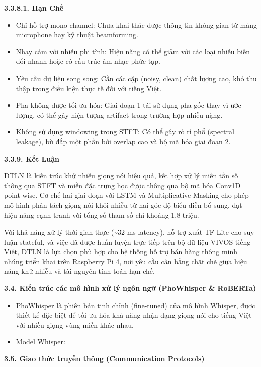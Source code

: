 \documentclass[
  13pt,
]{article}
\providecommand{\tightlist}{%
  \setlength{\itemsep}{0pt}\setlength{\parskip}{0pt}}
\begin{document}
\textbf{3.3.8.1. Hạn Chế}

\begin{itemize}
\tightlist
\item
  Chỉ hỗ trợ mono channel: Chưa khai thác được thông tin không gian từ
  mảng microphone hay kỹ thuật beamforming.\\
\item
  Nhạy cảm với nhiễu phi tĩnh: Hiệu năng có thể giảm với các loại nhiễu
  biến đổi nhanh hoặc có cấu trúc âm nhạc phức tạp.\\
\item
  Yêu cầu dữ liệu song song: Cần các cặp (noisy, clean) chất lượng cao,
  khó thu thập trong điều kiện thực tế đối với tiếng Việt.\\
\item
  Pha không được tối ưu hóa: Giai đoạn 1 tái sử dụng pha gốc thay vì ước
  lượng, có thể gây hiện tượng artifact trong trường hợp nhiễu nặng.\\
\item
  Không sử dụng windowing trong STFT: Có thể gây rò rỉ phổ (spectral
  leakage), bù đắp một phần bởi overlap cao và bộ mã hóa giai đoạn 2.
\end{itemize}

\textbf{3.3.9. Kết Luận}

DTLN là kiến trúc khử nhiễu giọng nói hiệu quả, kết hợp xử lý miền tần
số thông qua STFT và miền đặc trưng học được thông qua bộ mã hóa Conv1D
point-wise. Cơ chế hai giai đoạn với LSTM và Multiplicative Masking cho
phép mô hình phân tách giọng nói khỏi nhiễu từ hai góc độ biểu diễn bổ
sung, đạt hiệu năng cạnh tranh với tổng số tham số chỉ khoảng 1,8 triệu.

Với khả năng xử lý thời gian thực (\textasciitilde32 ms latency), hỗ trợ
xuất TF Lite cho suy luận stateful, và việc đã được huấn luyện trực tiếp
trên bộ dữ liệu VIVOS tiếng Việt, DTLN là lựa chọn phù hợp cho hệ thống
hỗ trợ bán hàng thông minh nhúng triển khai trên Raspberry Pi 4, nơi yêu
cầu cân bằng chặt chẽ giữa hiệu năng khử nhiễu và tài nguyên tính toán
hạn chế.

\textbf{3.4. Kiến trúc các mô hình xử lý ngôn ngữ (PhoWhisper \&
RoBERTa)}

\begin{itemize}
\tightlist
\item
  PhoWhisper là phiên bản tinh chỉnh (fine-tuned) của mô hình Whisper,
  được thiết kế đặc biệt để tối ưu hóa khả năng nhận dạng giọng nói cho
  tiếng Việt với nhiều giọng vùng miền khác nhau.\\
\item
  Model Whisper:
\end{itemize}

\textbf{3.5. Giao thức truyền thông (Communication Protocols)}
\end{document}
